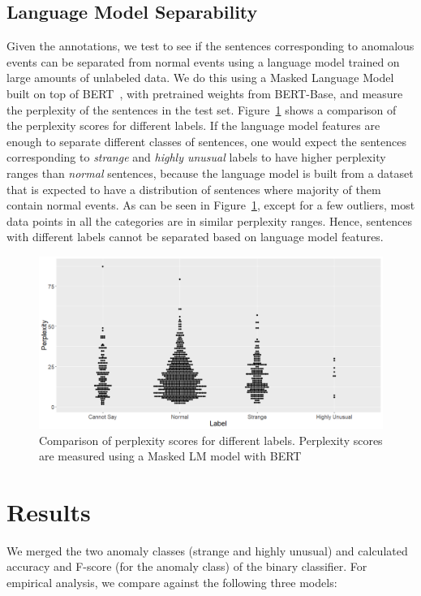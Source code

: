 \subsection{Language Model Separability}
Given the annotations, we test to see if the
sentences corresponding to anomalous events can be separated from normal events 
using a language model trained on large amounts of unlabeled data. We do this using
a Masked Language Model built on top of BERT~\citep{devlin2018bert}, with pretrained
weights from BERT-Base, and measure the perplexity of the sentences in the test set. 
Figure~\ref{fig:nem_lm_ppl} shows
a comparison of the perplexity scores for different labels. If the language model 
features are enough 
to separate different classes of sentences, one would expect the sentences 
corresponding to 
\textit{strange} and \textit{highly unusual} labels to have higher perplexity 
ranges than \textit{normal}
sentences, because the language model is built from a dataset that is expected 
to have a distribution of
sentences where majority of them contain normal events.  As can be seen in 
Figure~\ref{fig:nem_lm_ppl}, 
except for a few outliers, most data points in all the categories are in similar 
perplexity ranges.
Hence, sentences with different labels cannot be separated based on
language model features.

\begin{figure}
  \begin{center}
  \includegraphics[width=5in]{figures/perplexity_comparison_bert.png}
  \caption{Comparison of perplexity scores for different labels. Perplexity scores
	   are measured using a Masked LM model with BERT}\label{fig:nem_lm_ppl}
  \end{center}
\end{figure}

\section{Results}
We merged the two anomaly classes (strange and highly unusual) and calculated accuracy and F-score (for the anomaly class) of the binary
classifier. For empirical analysis, we compare against the following three
models:

